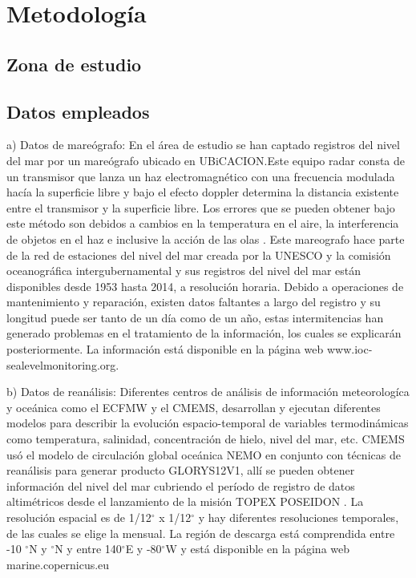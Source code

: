 \chapter{Metodología}

\section{Zona de estudio}

\section{Datos empleados}

a) Datos de mareógrafo: En el área de estudio se han captado registros del nivel del mar por un mareógrafo ubicado en UBiCACION.Este equipo radar consta de un transmisor que lanza un haz electromagnético con una frecuencia modulada hacía la superficie libre y bajo el efecto doppler determina la distancia existente entre el transmisor y la superficie libre. Los errores que se pueden obtener bajo este método son debidos a cambios en la temperatura en el aire, la interferencia de objetos en el haz e inclusive la acción de las olas \cite{UNESCO2016}. Este mareografo hace parte de la red de estaciones del nivel del mar creada por la UNESCO y la comisión oceanográfica intergubernamental y sus registros del nivel del mar están disponibles desde 1953 hasta 2014, a resolución horaria. Debido a operaciones de mantenimiento y reparación, existen datos faltantes a largo del registro y su longitud puede ser tanto de un día como de un año, estas intermitencias han generado problemas en el tratamiento de la información, los cuales se explicarán posteriormente. La información está disponible en la página web www.ioc-sealevelmonitoring.org.

b) Datos de reanálisis: Diferentes centros de análisis de información meteorologíca y oceánica como el ECFMW y el CMEMS, desarrollan y ejecutan diferentes modelos para describir la evolución espacio-temporal de variables termodinámicas como temperatura, salinidad, concentración de hielo, nivel del mar, etc. CMEMS usó el modelo de circulación global oceánica NEMO en conjunto con técnicas de reanálisis para generar producto GLORYS12V1, allí se pueden obtener información del nivel del mar cubriendo el período de registro de datos altimétricos desde el lanzamiento de la misión TOPEX POSEIDON \cite{Fernandez2018}. La resolución espacial es de 1/12$^{\circ}$ x 1/12$^{\circ}$ y hay diferentes resoluciones temporales, de las cuales se elige la mensual. La región de descarga está comprendida entre -10 $^{\circ}$N y $^{\circ}$N y entre 140$^{\circ}$E y -80$^{\circ}$W y está disponible en la página web marine.copernicus.eu

